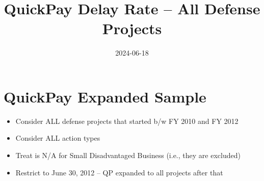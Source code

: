 \documentclass[
]{article}
\title{QuickPay Delay Rate -- All Defense Projects}
\author{}
\date{\vspace{-2.5em}2024-06-18}
\providecommand{\tightlist}{%
  \setlength{\itemsep}{0pt}\setlength{\parskip}{0pt}}
\begin{document}
\maketitle

\hypertarget{quickpay-expanded-sample}{%
\section{QuickPay Expanded Sample}\label{quickpay-expanded-sample}}

\begin{itemize}
\tightlist
\item
  Consider ALL defense projects that started b/w FY 2010 and FY 2012
\item
  Consider ALL action types
\item
  Treat is N/A for Small Disadvantaged Business (i.e., they are
  excluded)
\item
  Restrict to June 30, 2012 -- QP expanded to all projects after that
\end{itemize}
\end{document}
